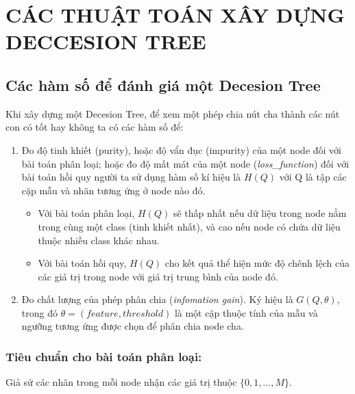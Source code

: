 \documentclass[12pt, a4paper]{article}
\begin{document}
\section{CÁC THUẬT TOÁN XÂY DỰNG DECCESION TREE}
\subsection{Các hàm số để đánh giá một Decesion Tree}

Khi xây dựng một Decesion Tree, để xem một phép chia nút cha thành các nút con có tốt hay không ta có các hàm số để:
\begin{enumerate}
    \item Đo độ tinh khiết (purity), hoặc độ vẩn đục (impurity) của một node đối với bài toán phân loại; hoặc đo độ mất mát của một node (\textit{loss\_function}) đối với bài toán hồi quy người ta
    sử dụng hàm số kí hiệu là $H(Q)$ với Q là tập các cặp mẫu và nhãn tương ứng ở node nào đó.
    \begin{itemize}
        \item  Với bài toán phân loại, $H(Q)$ sẽ thấp nhất nếu dữ liệu trong node nằm trong cùng một class (tinh khiết nhất), và cao nếu node có chứa dữ liệu thuộc nhiều class khác nhau.
        \item Với bài toán hồi quy, $H(Q)$ cho kết quả thể hiện mức độ chênh lệch của các giá trị trong node với giá trị trung bình của node đó.  
    \end{itemize}
    \item Đo chất lượng của phép phân chia (\textit{\hypertarget{*}{infomation gain}}). Ký hiệu là $G(Q, \theta)$, trong đó $\theta = (feature, threshold)$ là một cặp thuộc tính của mẫu và ngưỡng tương ứng được chọn để phân chia node cha.

\end{enumerate}

\subsubsection{Tiêu chuẩn cho  bài toán phân loại:}
Giả sử các nhãn trong mỗi node nhận các giá trị thuộc $\{0,1,...,M\}$.
\end{document}
